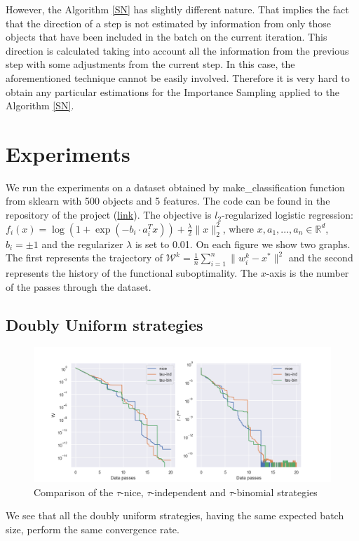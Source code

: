 \documentclass{article}
\theoremstyle{definition}
\theoremstyle{assumption}
\theoremstyle{lemma}
\theoremstyle{theorem}
\theoremstyle{proposition}
\begin{document}
	However, the Algorithm \ref{SN} has slightly different nature. That implies the fact that the direction of a step is not estimated by information from only those objects that have been included in the batch on the current iteration. This direction is calculated taking into account all the information from the previous step with some adjustments from the current step. In this case, the aforementioned technique cannot be easily involved. Therefore it is very hard to obtain any particular estimations for the Importance Sampling applied to the Algorithm \ref{SN}.
	
	\section{Experiments}
	
	We run the experiments on a dataset obtained by {\selectfont make\_classification} function from {\selectfont sklearn} with 500 objects and 5 features. The code can be found in the repository of the project (\href{https://github.com/intsystems/2023-Project-136/tree/master/code}{link}). The objective is $l_2$-regularized logistic regression: $f_i(x) = \log(1 + \exp(-b_i \cdot a_i^T x)) + \frac{\lambda}{2}\|x\|_2^2$, where $x, a_1, ..., a_n \in \mathbb R^d$, $b_i = \pm 1$ and the regularizer $\lambda$ is set to 0.01. On each figure we show two graphs. The first represents the trajectory of $\mathcal W^k = \frac{1}{n} \sum \limits_{i=1}^n \|w_i^k - x^* \|^2$ and the second represents the history of the functional suboptimality. The $x$-axis is the number of the passes through the dataset. 
	
	\subsection{Doubly Uniform strategies}
	\begin{figure}[h!]\label{fig:1}
		\centering
		\includegraphics[width=\textwidth]{uniform strategies}
		\caption{Comparison of the $\tau$-nice, $\tau$-independent and $\tau$-binomial strategies}
	\end{figure}
	We see that all the doubly uniform strategies, having the same expected batch size, perform the same convergence rate.
	
\end{document}
